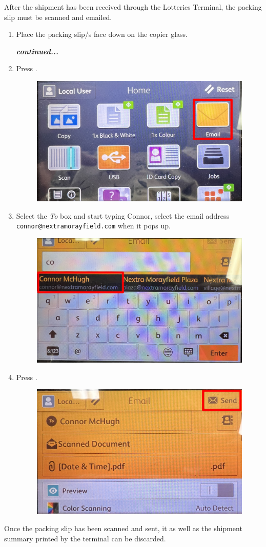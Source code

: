 \documentclass[a4paper, 12pt]{article}
\begin{document}
After the shipment has been received through the Lotteries Terminal, the packing slip must be scanned and emailed.
\begin{enumerate}
    \item Place the packing slip/s face down on the copier glass.
    \\
    \begin{flushright}
        \textbf{\textit{continued...}}
    \end{flushright}
    \newpage
    \item Press .
    \begin{figure}[h]
        \centering
        \includegraphics[width=0.5\linewidth]{images/printermain.JPG}
    \end{figure}
    \item Select the \textit{To} box and start typing Connor, select the email address  \\ \texttt{connor@nextramorayfield.com} when it pops up.
    \begin{figure}[h]
        \centering
        \includegraphics[width=0.5\linewidth]{images/email.JPG}
    \end{figure}
    \item Press .
    \begin{figure}[h]
        \centering
        \includegraphics[width=0.5\linewidth]{images/send.JPG}
    \end{figure}
\end{enumerate}
Once the packing slip has been scanned and sent, it as well as the shipment summary printed by the terminal can be discarded.
\end{document}
